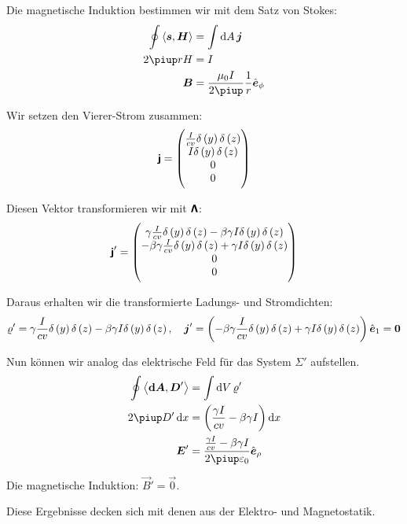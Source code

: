 Die magnetische Induktion bestimmen wir mit dem Satz von Stokes:
\begin{align*}
	\oint \inner{\vec s}{\vec H} &= \int \dif A \, \vec j \\
	2 \piup r H &= I \\
	\vec B &= \frac{\mu_0 I}{2 \piup} \frac 1r \ev_\phi
\end{align*}

Wir setzen den Vierer-Strom zusammen:
\[
	\tens j
	=
	\begin{pmatrix}
		\frac I{cv} \delta\del y \delta\del z \\
		I \delta\del y \delta\del z \\
		0 \\
		0
	\end{pmatrix}
\]

Diesen Vektor transformieren wir mit $\boldsymbol{\mathsf{\Lambda}}$:
\[
	\tens j'
	=
	\begin{pmatrix}
		\gamma \frac I{cv} \delta\del y \delta\del z
		- \beta\gamma I \delta\del y \delta\del z \\
		-\beta\gamma \frac I{cv} \delta\del y \delta\del z
		+ \gamma I \delta\del y \delta\del z \\
		0 \\
		0
	\end{pmatrix}
\]

Daraus erhalten wir die transformierte Ladungs- und Stromdichten:
\[
	\varrho'
	=
	\gamma \frac I{cv} \delta\del y \delta\del z
	- \beta\gamma I \delta\del y \delta\del z
	\eqnsep
	\vec j'
	=
	\del{
		-\beta\gamma \frac I{cv} \delta\del y \delta\del z
		+ \gamma I \delta\del y \delta\del z
	} \ev_1
	= \vec 0
\]

Nun können wir analog das elektrische Feld für das System $\Sigma'$ aufstellen.
\begin{align*}
	\oint \inner{\vec{\dif A}}{\vec D'}
	&=
	\int \dif V \, \varrho' \\
	2 \piup D' \dif x &= \del{\frac{\gamma I}{cv} - \beta\gamma I} \dif x \\
	\vec E' &= \frac{\frac{\gamma I}{cv} - \beta\gamma I}{2 \piup \varepsilon_0} \ev_\rho
\end{align*}

Die magnetische Induktion: $\vec B' = \vec 0$.

Diese Ergebnisse decken sich mit denen aus der Elektro- und Magnetostatik.


